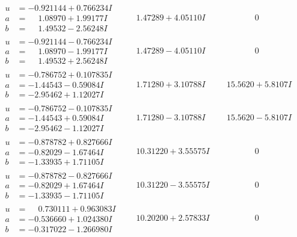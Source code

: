 \documentclass[1p]{elsarticle_modified}
\theoremstyle{definition}
\begin{document}
$$\begin{array}{c|c|c}
\begin{aligned}
u &= -0.921144 + 0.766234 I \\
a &= \phantom{-}1.08970 + 1.99177 I \\
b &= \phantom{-}1.49532 - 2.56248 I\end{aligned}
 & \phantom{-}1.47289 + 4.05110 I & \phantom{-0.000000 } 0 \\ \hline\begin{aligned}
u &= -0.921144 - 0.766234 I \\
a &= \phantom{-}1.08970 - 1.99177 I \\
b &= \phantom{-}1.49532 + 2.56248 I\end{aligned}
 & \phantom{-}1.47289 - 4.05110 I & \phantom{-0.000000 } 0 \\ \hline\begin{aligned}
u &= -0.786752 + 0.107835 I \\
a &= -1.44543 - 0.59084 I \\
b &= -2.95462 + 1.12027 I\end{aligned}
 & \phantom{-}1.71280 + 3.10788 I & \phantom{-}15.5620 + 5.8107 I \\ \hline\begin{aligned}
u &= -0.786752 - 0.107835 I \\
a &= -1.44543 + 0.59084 I \\
b &= -2.95462 - 1.12027 I\end{aligned}
 & \phantom{-}1.71280 - 3.10788 I & \phantom{-}15.5620 - 5.8107 I \\ \hline\begin{aligned}
u &= -0.878782 + 0.827666 I \\
a &= -0.82029 - 1.67464 I \\
b &= -1.33935 + 1.71105 I\end{aligned}
 & \phantom{-}10.31220 + 3.55575 I & \phantom{-0.000000 } 0 \\ \hline\begin{aligned}
u &= -0.878782 - 0.827666 I \\
a &= -0.82029 + 1.67464 I \\
b &= -1.33935 - 1.71105 I\end{aligned}
 & \phantom{-}10.31220 - 3.55575 I & \phantom{-0.000000 } 0 \\ \hline\begin{aligned}
u &= \phantom{-}0.730111 + 0.963083 I \\
a &= -0.536660 + 1.024380 I \\
b &= -0.317022 - 1.266980 I\end{aligned}
 & \phantom{-}10.20200 + 2.57833 I & \phantom{-0.000000 } 0\\

\end{array}$$
\end{document}
